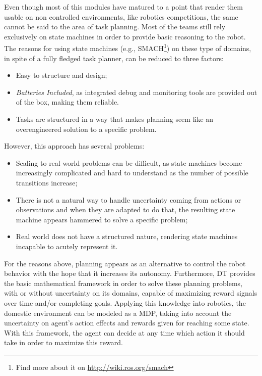 Even though most of this modules have matured to a point that render them
usable on non controlled environments, like robotics competitions, the same
cannot be said to the area of task planning. Most of the teams still rely
exclusively on state machines in order to provide basic reasoning to the robot.
The reasons for using state machines (e.g., SMACH\footnote{Find more about it on
\url{http://wiki.ros.org/smach}}) on these type of domains, in spite of a fully
fledged task planner, can be reduced to three factors:
\begin{itemize}
  \item Easy to structure and design;
  \item \textit{Batteries Included}, as integrated debug and monitoring tools
  are provided out of the box, making them reliable.
  \item Tasks are structured in a way that makes planning seem like an
  overengineered solution to a specific problem.
\end{itemize}

However, this approach has several problems:
\begin{itemize}
  \item Scaling to real world problems can be difficult, as state machines
  become increasingly complicated and hard to understand as the number of
  possible transitions increase;
  \item There is not a natural way to handle uncertainty coming from actions or
  observations and when they are adapted to do that, the resulting state machine
  appears hammered to solve a specific problem;
  \item Real world does not have a structured nature, rendering state machines
  incapable to acutely represent it.
\end{itemize}

For the reasons above, planning appears as an alternative to control the robot
behavior with the hope that it increases its autonomy. Furthermore, \gls{DT}
provides the basic mathematical framework in order to solve these
planning problems, with or without uncertainty on its domains, capable of
maximizing reward signals over time and/or completing goals. Applying this
knowledge into robotics, the domestic environment can be modeled as a
\gls{MDP}, taking into account the uncertainty on agent's action effects and
rewards given for reaching some state. With this framework, the agent can
decide at any time which action it should take in order to maximize this reward.
\par

